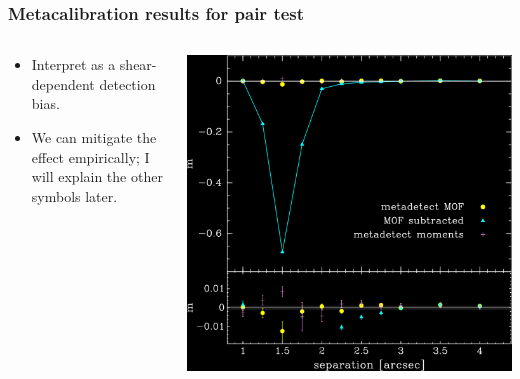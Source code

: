\documentclass{beamer}
\begin{document}
\begin{frame}
    \frametitle{Metacalibration results for pair test}

 
    \begin{columns}
        \begin{column}{0.4\textwidth}
            \begin{itemize}

                \item Interpret as a {\color{lightsteelblue} shear-dependent detection bias}.

                \item We can mitigate the effect empirically; I will explain
                    the other symbols later.

            \end{itemize}
        \end{column}
        \begin{column}{0.6\textwidth}
            \begin{center}
                \includegraphics[width=\columnwidth]{pairs-mc-bdkpair-negate.png}
            \end{center}
        \end{column}
    \end{columns}
\end{frame}
\end{document}
